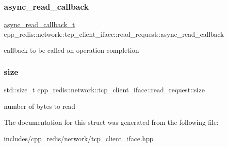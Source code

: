 \subsubsection{\texorpdfstring{async\+\_\+read\+\_\+callback}{async\_read\_callback}}
{\footnotesize\ttfamily \mbox{\hyperlink{classcpp__redis_1_1network_1_1tcp__client__iface_ae8bf79e8e1f1d7e359ed1c7cdc4026fc}{async\+\_\+read\+\_\+callback\+\_\+t}} cpp\+\_\+redis\+::network\+::tcp\+\_\+client\+\_\+iface\+::read\+\_\+request\+::async\+\_\+read\+\_\+callback}

callback to be called on operation completion \mbox{\label{structcpp__redis_1_1network_1_1tcp__client__iface_1_1read__request_a5ff8258391c9b3c8d2ce1a5c5a0304be}} 
\subsubsection{\texorpdfstring{size}{size}}
{\footnotesize\ttfamily std\+::size\+\_\+t cpp\+\_\+redis\+::network\+::tcp\+\_\+client\+\_\+iface\+::read\+\_\+request\+::size}

number of bytes to read 

The documentation for this struct was generated from the following file\+:\begin{DoxyCompactItemize}
\item 
includes/cpp\+\_\+redis/network/tcp\+\_\+client\+\_\+iface.\+hpp\end{DoxyCompactItemize}
